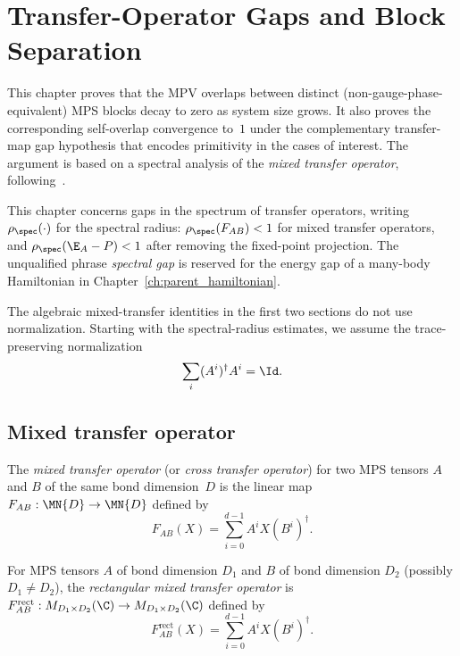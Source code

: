 \chapter{Transfer-Operator Gaps and Block Separation}\label{ch:spectral}

This chapter proves that the MPV overlaps between distinct
(non-gauge-phase-equivalent) MPS blocks decay to zero as system
size grows. It also proves the corresponding self-overlap convergence
to~$1$ under the complementary transfer-map gap hypothesis that encodes
primitivity in the cases of interest. The argument is based on a
spectral analysis of the \emph{mixed transfer operator},
following~\cite{PerezGarcia2007Matrix}.

This chapter concerns gaps in the spectrum of transfer operators,
writing $\rho_{\spec}(\cdot)$ for the spectral radius:
$\rho_{\spec}(F_{AB}) < 1$ for mixed transfer operators, and
$\rho_{\spec}(\E_A - P) < 1$ after removing the fixed-point projection. The
unqualified phrase \emph{spectral gap} is reserved for the energy gap of a
many-body Hamiltonian in Chapter~\ref{ch:parent_hamiltonian}.

The algebraic mixed-transfer identities in the first two sections do
not use normalization. Starting with the spectral-radius estimates,
we assume the trace-preserving normalization
\begin{equation}\label{eq:spec_tp_normalization}
    \sum_i (A^i)^\dagger A^i = \Id.
\end{equation}

\section{Mixed transfer operator}

\begin{definition}\label{def:mixed_transfer}
    \leanok
    The \emph{mixed transfer operator} (or \emph{cross transfer
        operator}) for two MPS tensors $A$ and $B$ of the same bond
    dimension~$D$ is the linear map
    $F_{AB} : \MN{D} \to \MN{D}$ defined by
    \[
        F_{AB}(X) =  \sum_{i=0}^{d-1} A^i X (B^i)^\dagger.
    \]
\end{definition}

\begin{definition}\label{def:mixed_transfer_rect}
    \leanok
    For MPS tensors $A$ of bond dimension $D_1$ and $B$ of bond
    dimension $D_2$ (possibly $D_1 \neq D_2$), the
    \emph{rectangular mixed transfer operator} is
    $F_{AB}^{\mathrm{rect}} :
        M_{D_1 \times D_2}(\C) \to M_{D_1 \times D_2}(\C)$
    defined by
    \[
        F_{AB}^{\mathrm{rect}}(X)
        =  \sum_{i=0}^{d-1} A^i X (B^i)^\dagger.
    \]
\end{definition}

